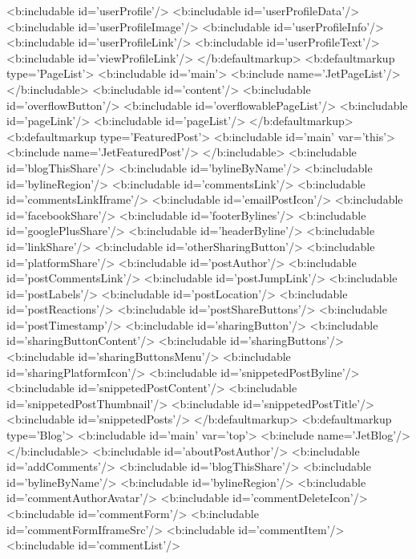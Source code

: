 {{{{    <b:includable id='userProfile'/>
    <b:includable id='userProfileData'/>
    <b:includable id='userProfileImage'/>
    <b:includable id='userProfileInfo'/>
    <b:includable id='userProfileLink'/>
    <b:includable id='userProfileText'/>
    <b:includable id='viewProfileLink'/>
  </b:defaultmarkup>
  <b:defaultmarkup type='PageList'>
    <b:includable id='main'>
      <b:include name='JetPageList'/>
    </b:includable>
    <b:includable id='content'/>
    <b:includable id='overflowButton'/>
    <b:includable id='overflowablePageList'/>
    <b:includable id='pageLink'/>
    <b:includable id='pageList'/>
  </b:defaultmarkup>
  <b:defaultmarkup type='FeaturedPost'>
    <b:includable id='main' var='this'>
      <b:include name='JetFeaturedPost'/>
    </b:includable>
    <b:includable id='blogThisShare'/>
    <b:includable id='bylineByName'/>
    <b:includable id='bylineRegion'/>
    <b:includable id='commentsLink'/>
    <b:includable id='commentsLinkIframe'/>
    <b:includable id='emailPostIcon'/>
    <b:includable id='facebookShare'/>
    <b:includable id='footerBylines'/>
    <b:includable id='googlePlusShare'/>
    <b:includable id='headerByline'/>
    <b:includable id='linkShare'/>
    <b:includable id='otherSharingButton'/>
    <b:includable id='platformShare'/>
    <b:includable id='postAuthor'/>
    <b:includable id='postCommentsLink'/>
    <b:includable id='postJumpLink'/>
    <b:includable id='postLabels'/>
    <b:includable id='postLocation'/>
    <b:includable id='postReactions'/>
    <b:includable id='postShareButtons'/>
    <b:includable id='postTimestamp'/>
    <b:includable id='sharingButton'/>
    <b:includable id='sharingButtonContent'/>
    <b:includable id='sharingButtons'/>
    <b:includable id='sharingButtonsMenu'/>
    <b:includable id='sharingPlatformIcon'/>
    <b:includable id='snippetedPostByline'/>
    <b:includable id='snippetedPostContent'/>
    <b:includable id='snippetedPostThumbnail'/>
    <b:includable id='snippetedPostTitle'/>
    <b:includable id='snippetedPosts'/>
  </b:defaultmarkup>
  <b:defaultmarkup type='Blog'>
    <b:includable id='main' var='top'>
      <b:include name='JetBlog'/>
    </b:includable>
    <b:includable id='aboutPostAuthor'/>
    <b:includable id='addComments'/>
    <b:includable id='blogThisShare'/>
    <b:includable id='bylineByName'/>
    <b:includable id='bylineRegion'/>
    <b:includable id='commentAuthorAvatar'/>
    <b:includable id='commentDeleteIcon'/>
    <b:includable id='commentForm'/>
    <b:includable id='commentFormIframeSrc'/>
    <b:includable id='commentItem'/>
    <b:includable id='commentList'/>
}}}}
